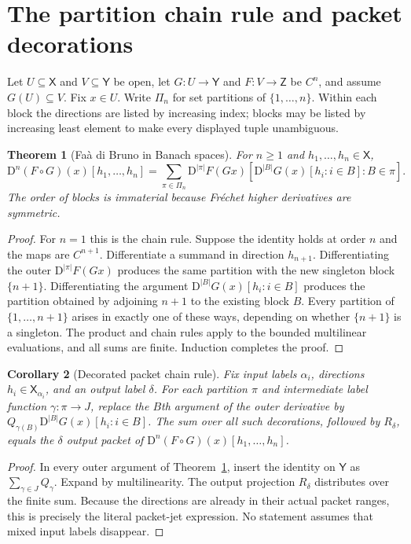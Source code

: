 \documentclass[11pt]{article}
\newtheorem{theorem}{Theorem}[section]
\newtheorem{corollary}[theorem]{Corollary}
\theoremstyle{remark}\newtheorem{remark}[theorem]{Remark}
\newcommand{\X}{\mathsf X}\newcommand{\Y}{\mathsf Y}\newcommand{\Z}{\mathsf Z}
\newcommand{\D}{\mathrm D}
\begin{document}
\section{The partition chain rule and packet decorations}
Let $U\subseteq\X$ and $V\subseteq\Y$ be open, let $G:U\to\Y$ and $F:V\to\Z$ be $C^n$, and assume $G(U)\subseteq V$. Fix $x\in U$. Write $\Pi_n$ for set partitions of $\{1,\ldots,n\}$. Within each block the directions are listed by increasing index; blocks may be listed by increasing least element to make every displayed tuple unambiguous.
\begin{theorem}[Fa\`a di Bruno in Banach spaces]\label{thm:faa}
For $n\ge1$ and $h_1,\ldots,h_n\in\X$,
\[
\D^n(F\circ G)(x)[h_1,\ldots,h_n]
=\sum_{\pi\in\Pi_n}\D^{|\pi|}F(Gx)
\left[\D^{|B|}G(x)[h_i:i\in B]:B\in\pi\right].
\]
The order of blocks is immaterial because Fr\'echet higher derivatives are symmetric.
\end{theorem}
\begin{proof}
For $n=1$ this is the chain rule. Suppose the identity holds at order $n$ and the maps are $C^{n+1}$. Differentiate a summand in direction $h_{n+1}$. Differentiating the outer $\D^{|\pi|}F(Gx)$ produces the same partition with the new singleton block $\{n+1\}$. Differentiating the argument $\D^{|B|}G(x)[h_i:i\in B]$ produces the partition obtained by adjoining $n+1$ to the existing block $B$. Every partition of $\{1,\ldots,n+1\}$ arises in exactly one of these ways, depending on whether $\{n+1\}$ is a singleton. The product and chain rules apply to the bounded multilinear evaluations, and all sums are finite. Induction completes the proof.
\end{proof}

\begin{corollary}[Decorated packet chain rule]\label{cor:decorated}
Fix input labels $\alpha_i$, directions $h_i\in\X_{\alpha_i}$, and an output label $\delta$. For each partition $\pi$ and intermediate label function $\gamma:\pi\to J$, replace the $B$th argument of the outer derivative by $Q_{\gamma(B)}\D^{|B|}G(x)[h_i:i\in B]$. The sum over all such decorations, followed by $R_\delta$, equals the $\delta$ output packet of $\D^n(F\circ G)(x)[h_1,\ldots,h_n]$.
\end{corollary}
\begin{proof}
In every outer argument of Theorem~\ref{thm:faa}, insert the identity on $\Y$ as $\sum_{\gamma\in J}Q_\gamma$. Expand by multilinearity. The output projection $R_\delta$ distributes over the finite sum. Because the directions are already in their actual packet ranges, this is precisely the literal packet-jet expression. No statement assumes that mixed input labels disappear.
\end{proof}
\end{document}
